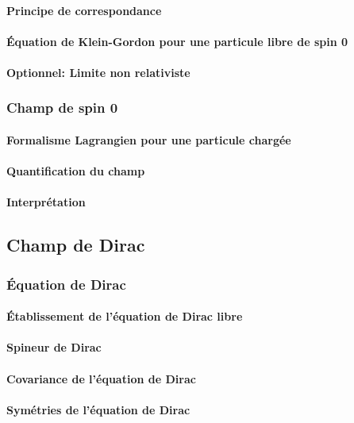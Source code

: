 \documentclass{article}
\begin{document}
				\paragraph{Principe de correspondance}
				\paragraph{Équation de Klein-Gordon pour une particule libre de spin 0}
				\paragraph{Optionnel: Limite non relativiste}
			\subsubsection{Champ de spin 0}
				\paragraph{Formalisme Lagrangien pour une particule chargée}
				\paragraph{Quantification du champ}
				\paragraph{Interprétation}	
				
		\subsection{Champ de Dirac}	
				
			\subsubsection{Équation de Dirac}
				\paragraph{Établissement de l'équation de Dirac libre}
				\paragraph{Spineur de Dirac}
				\paragraph{Covariance de l'équation de Dirac}
				\paragraph{Symétries de l'équation de Dirac}
\end{document}
